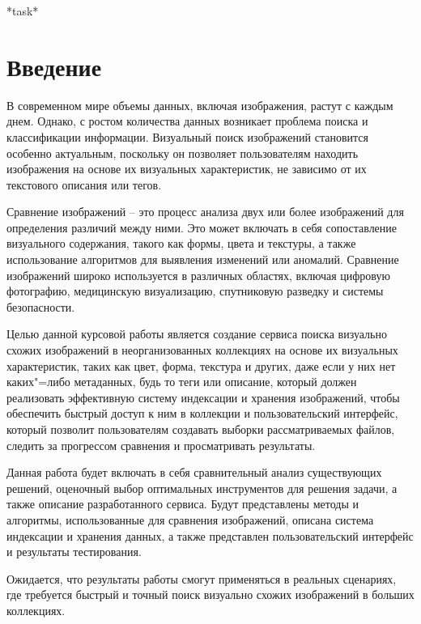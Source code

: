 \documentclass[variant=courcework]{bsuir}
\begin{document}
\maketitle

\clearpage{}*{task}*

\tableofcontents

\chapter*{Введение}

В современном мире объемы данных, включая изображения, растут с каждым днем.
Однако, с ростом количества данных возникает проблема поиска и классификации
информации. Визуальный поиск изображений становится особенно актуальным,
поскольку он позволяет пользователям находить изображения на основе их
визуальных характеристик, не зависимо от их текстового описания или тегов.

Сравнение изображений -- это процесс анализа двух или более изображений для
определения различий между ними. Это может включать в себя сопоставление
визуального содержания, такого как формы, цвета и текстуры, а также
использование алгоритмов для выявления изменений или аномалий. Сравнение
изображений широко используется в различных областях, включая цифровую
фотографию, медицинскую визуализацию, спутниковую разведку и системы
безопасности.

Целью данной курсовой работы является создание сервиса поиска визуально схожих
изображений в неорганизованных коллекциях на основе их визуальных характеристик,
таких как цвет, форма, текстура и других, даже если у них нет каких"=либо
метаданных, будь то теги или описание, который должен реализовать эффективную
систему индексации и хранения изображений, чтобы обеспечить быстрый доступ к ним
в коллекции и пользовательский интерфейс, который позволит пользователям
создавать выборки рассматриваемых файлов, следить за прогрессом сравнения и
просматривать результаты.

Данная работа будет включать в себя сравнительный анализ существующих решений,
оценочный выбор оптимальных инструментов для решения задачи, а также описание
разработанного сервиса. Будут представлены методы и алгоритмы, использованные
для сравнения изображений, описана система индексации и хранения данных, а также
представлен пользовательский интерфейс и результаты тестирования.

Ожидается, что результаты работы смогут применяться в реальных сценариях, где
требуется быстрый и точный поиск визуально схожих изображений в больших
коллекциях.
\end{document}
